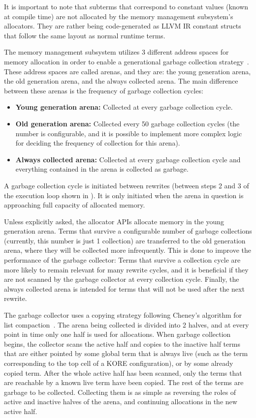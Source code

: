 \documentclass{article}
\theoremstyle{definition}
\begin{document}
It is important to note that subterms that correspond to constant values (known at compile time) are not allocated by the memory management subsystem’s allocators. They are rather being code-generated as LLVM IR constant structs that follow the same layout as normal runtime terms.

The memory management subsystem utilizes 3 different address spaces for memory allocation in order to enable a generational garbage collection strategy~\cite{Ungar1984}. These address spaces are called arenas, and they are: the young generation arena, the old generation arena, and the always collected arena. The main difference between these arenas is the frequency of garbage collection cycles:
\begin{itemize}
    \item \textbf{Young generation arena:} Collected at every garbage collection cycle.
    \item \textbf{Old generation arena:} Collected every 50 garbage collection cycles (the number is configurable, and it is possible to implement more complex logic for deciding the frequency of collection for this arena).
    \item \textbf{Always collected arena:} Collected at every garbage collection cycle and everything contained in the arena is collected as garbage.
\end{itemize}
A garbage collection cycle is initiated between rewrites (between steps 2 and 3 of the execution loop shown in ). It is only initiated when the arena in question is approaching full capacity of allocated memory.

Unless explicitly asked, the allocator APIs allocate memory in the young generation arena. Terms that survive a configurable number of garbage collections (currently, this number is just 1 collection) are transferred to the old generation arena, where they will be collected more infrequently. This is done to improve the performance of the garbage collector: Terms that survive a collection cycle are more likely to remain relevant for many rewrite cycles, and it is beneficial if they are not scanned by the garbage collector at every collection cycle. Finally, the always collected arena is intended for terms that will not be used after the next rewrite.

The garbage collector uses a copying strategy following Cheney's algorithm for list compaction~\cite{Cheney1970}. The arena being collected is divided into 2 halves, and at every point in time only one half is used for allocations. When garbage collection begins, the collector scans the active half and copies to the inactive half terms that are either pointed by some global term that is always live (such as the term corresponding to the top cell of a KORE configuration), or by some already copied term. After the whole active half has been scanned, only the terms that are reachable by a known live term have been copied. The rest of the terms are garbage to be collected. Collecting them is as simple as reversing the roles of active and inactive halves of the arena, and continuing allocations in the new active half.
\end{document}
